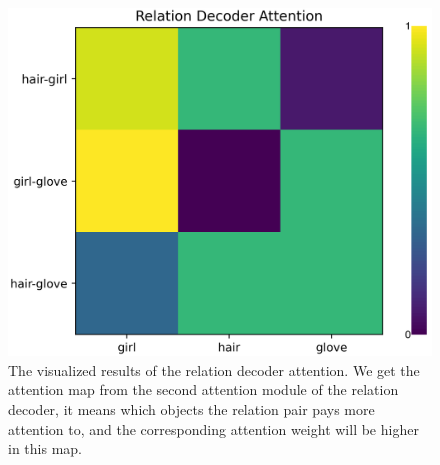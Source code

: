 \begin{figure}[h!]
{		\begin{minipage}[t]{5cm}
			\centering
			\includegraphics[width=1\linewidth]{figures/result/relation_Attention/att2}
		\end{minipage}
	}
	
	\caption[The visualized results of the relation decoder attention.]{The visualized results of the relation decoder attention. We get the attention map from the second attention module of the relation decoder, it means which objects the relation pair pays more attention to, and the corresponding  attention weight will be higher in this map.}
	\label{fig:relation_attetnion}
\end{figure}



